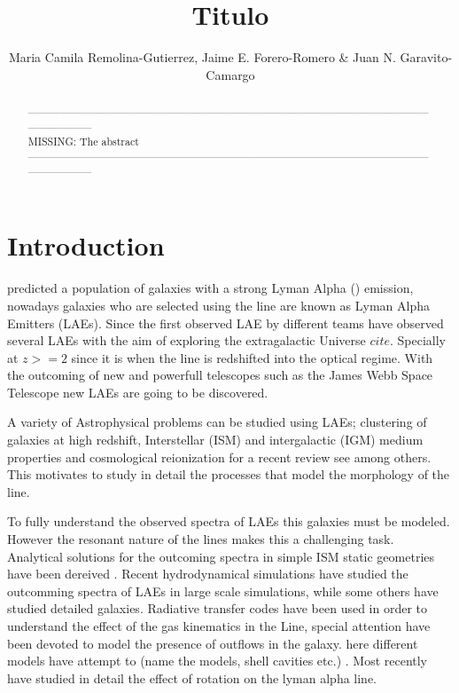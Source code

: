 \documentclass{latex/emulateapj}
\begin{document}
\title{Titulo}


\author{ Maria Camila Remolina-Gutierrez, Jaime E. Forero-Romero \& Juan N. Garavito-Camargo}


\begin{abstract}
\noindent ------------------------------------------------------------------------------------------------------------------------------------\\
MISSING: The abstract\\
------------------------------------------------------------------------------------------------------------------------------------\\
\end{abstract}

\section{Introduction}
\label{sec:intro}

\cite{PartridgePeebles} predicted a population of galaxies with a strong 
Lyman Alpha (\lya) emission,  nowadays galaxies who are selected using the \lya 
line are known as Lyman Alpha Emitters (LAEs). Since the first 
observed LAE by \cite{DjorgovskiThompson} different teams have 
observed several LAEs \cite{Kulas12, Ostlin14} with the aim of  
exploring the extragalactic Universe $cite{}$.  Specially at $z>=2$ since it is when the 
line is redshifted into the optical regime. With the outcoming of new and powerfull telescopes
such as the James Webb Space Telescope new LAEs are going to be discovered.

A variety of Astrophysical problems can be studied using LAEs; clustering
of galaxies at high redshift, Interstellar (ISM) and intergalactic (IGM) medium 
properties and cosmological reionization for a recent review see \cite{review} 
among others. This motivates to study in 
detail the processes that model the morphology of the \lya line.

To fully understand the observed spectra of LAEs this galaxies must be modeled.
However the resonant nature of the lines makes this a challenging task. 
Analytical solutions for the outcoming spectra in simple ISM static geometries have been dereived
\cite{Neufeld90}. Recent hydrodynamical simulations have studied the outcomming spectra of LAEs
in large scale simulations, while some others have studied detailed galaxies. 
Radiative transfer codes have been used in order to understand the effect of the 
gas kinematics in the Line, special attention have been devoted to model the presence 
of outflows in the galaxy. here different models have attempt to (name the models, shell cavities etc.)
. Most recently \cite{Garavito14} have studied in detail the effect 
of rotation on the lyman alpha line.
\end{document}
